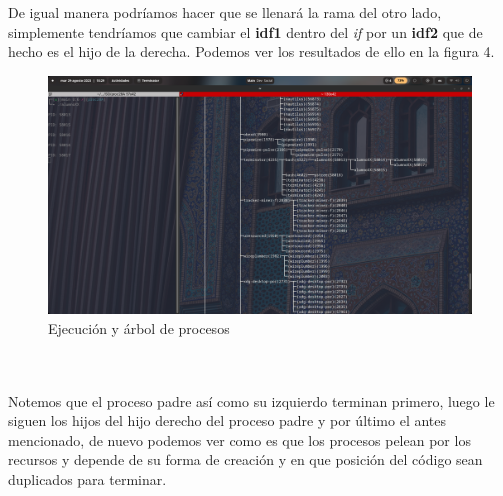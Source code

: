 \documentclass[11pt]{article}
\begin{document}
De igual manera podríamos hacer que se llenará la rama del otro lado, simplemente tendríamos que cambiar el \textbf{idf1} dentro del \textit{if} por un \textbf{idf2} que de hecho es el hijo de la derecha. Podemos ver los resultados de ello en la figura 4.
\begin{figure}
\centering
\includegraphics[width=\linewidth]{p8.png}
\caption{Ejecución y árbol de procesos}
\label{img: p8}
\end{figure}
\\\\
Notemos que el proceso padre así como su izquierdo terminan primero, luego le siguen los hijos del hijo derecho del proceso padre y por último el antes mencionado, de nuevo podemos ver como es que los procesos pelean por los recursos y depende de su forma de creación y en que posición del código sean duplicados para terminar. 
\end{document}
